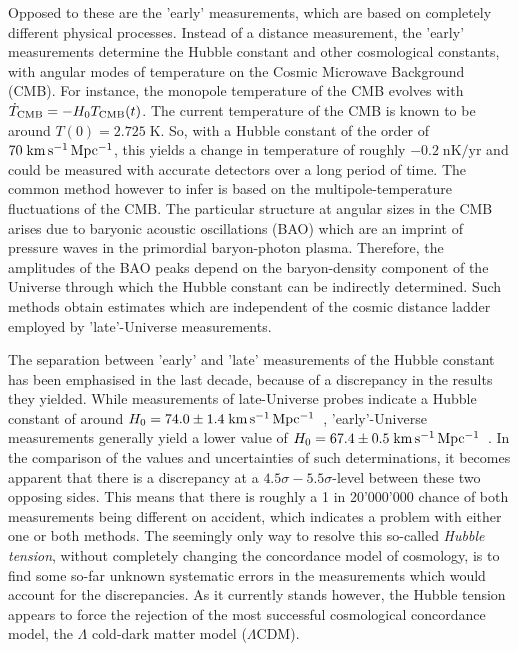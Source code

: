 Opposed to these are the 'early' measurements, which are based on completely
different physical processes.  Instead of a distance measurement, the 'early'
measurements determine the Hubble constant and other cosmological constants,
with angular modes of temperature on the Cosmic Microwave Background (CMB).  For
instance, the monopole temperature of the CMB evolves with $\dot{T}_{\text{CMB}}
= -H_{0}{}T_{\text{CMB}}(t)$.  The current temperature of the CMB is known to be
around $T(0) = 2.725\;\mathrm{K}$. So, with a Hubble constant of the order of
$70\;\mathrm{km\,s^{-1}\,Mpc^{-1}}{}$, this yields a change in temperature of roughly
$-0.2\;\mathrm{nK/yr}$ and could be measured with accurate detectors over a long
period of time.  The common method however to infer \Ho{} is based on the
multipole-temperature fluctuations of the CMB.  The particular structure at
angular sizes in the CMB arises due to baryonic acoustic oscillations (BAO)
which are an imprint of pressure waves in the primordial baryon-photon plasma.
Therefore, the amplitudes of the BAO peaks depend on the baryon-density
component of the Universe through which the Hubble constant can be indirectly
determined.  Such methods obtain estimates which are independent of the cosmic
distance ladder employed by 'late'-Universe measurements.

The separation between 'early' and 'late' measurements of the Hubble constant
has been emphasised in the last decade, because of a discrepancy in the results
they yielded.  While measurements of late-Universe probes indicate a Hubble
constant of around $H_{0} = 74.0 \pm 1.4\;\mathrm{km\,s^{-1}\,Mpc^{-1}}$~, 'early'-Universe
measurements generally yield a lower value of $H_{0} = 67.4 \pm
0.5\;\mathrm{km\,s^{-1}\,Mpc^{-1}}$~.  In the comparison of the
values and uncertainties of such determinations, it becomes apparent that there
is a discrepancy at a $4.5\sigma-5.5\sigma$-level between these two opposing sides.  This means
that there is roughly a 1 in 20'000'000 chance of both measurements being
different on accident, which indicates a problem with either one or both
methods.  The seemingly only way to resolve this so-called \textit{Hubble
tension}, without completely changing the concordance model of cosmology, is to
find some so-far unknown systematic errors in the measurements which would
account for the discrepancies.  As it currently stands however, the Hubble
tension appears to force the rejection of the most successful cosmological
concordance model, the $\Lambda$ cold-dark matter model ($\Lambda$CDM). 

